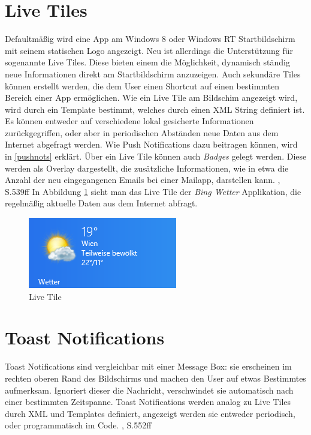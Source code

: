 \documentclass[a4paper,bibtotoc,oneside]{scrbook}
\begin{document}
\section[Live Tiles]{Live Tiles}
Defaultmäßig wird eine App am Windows 8 oder Windows RT Startbildschirm mit seinem statischen Logo angezeigt. Neu ist allerdings die Unterstützung für sogenannte Live Tiles. Diese bieten einem die Möglichkeit, dynamisch ständig neue Informationen direkt am Startbildschirm anzuzeigen. Auch sekundäre Tiles können erstellt werden, die dem User einen Shortcut auf einen bestimmten Bereich einer App ermöglichen.
\newline
\newline
Wie ein Live Tile am Bildschim angezeigt wird, wird durch ein Template bestimmt, welches durch einen XML String definiert ist. Es können entweder auf verschiedene lokal gesicherte Informationen zurückgegriffen, oder aber in periodischen Abständen neue Daten aus dem Internet abgefragt werden. Wie Push Notifications dazu beitragen können, wird in \ref{pushnots} erklärt.
\newline
\newline
Über ein Live Tile können auch \textit{Badges} gelegt werden. Diese werden als Overlay dargestellt, die zusätzliche Informationen, wie in etwa die Anzahl der neu eingegangenen Emails bei einer Mailapp, darstellen kann. \cite{ana12}, S.539ff
\newline
\newline
In Abbildung \ref{img:livetile} sieht man das Live Tile der \textit{Bing Wetter} Applikation, die regelmäßig aktuelle Daten aus dem Internet abfragt.
\newline
\begin{figure}[htbp]
\centering
\includegraphics[scale=1.2]{images/livetile.png}
\caption[Live Tile]{Live Tile}\label{img:livetile}
\end{figure}

\section[Toast Notifications]{Toast Notifications}
Toast Notifications sind vergleichbar mit einer Message Box: sie erscheinen im rechten oberen Rand des Bildschirms und machen den User auf etwas Bestimmtes aufmerksam. Ignoriert dieser die Nachricht, verschwindet sie automatisch nach einer bestimmten Zeitspanne. 
\newline
Toast Notifications werden analog zu Live Tiles durch XML und Templates definiert, angezeigt werden sie entweder periodisch, oder programmatisch im Code. \cite{ana12}, S.552ff
\end{document}
